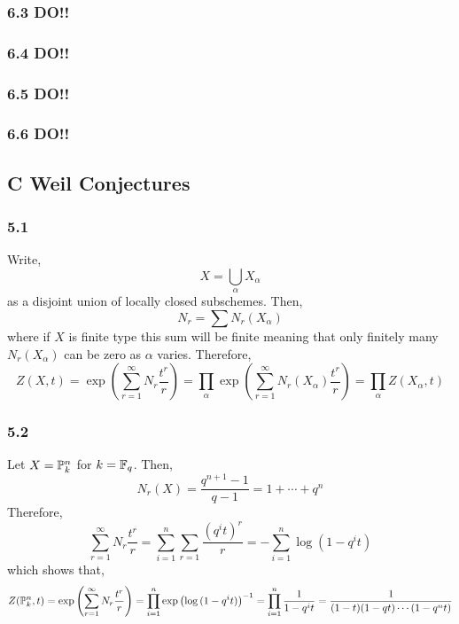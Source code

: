 \documentclass[12pt]{article}
\begin{document}
\subsubsection{6.3 DO!!}


\subsubsection{6.4 DO!!}

\subsubsection{6.5 DO!!}

\subsubsection{6.6 DO!!}


\subsection{C Weil Conjectures}

\subsubsection{5.1}

Write,
\[ X = \bigcup_{\alpha} X_\alpha \]
as a disjoint union of locally closed subschemes. Then,
\[ N_r = \sum N_r(X_\alpha) \]
where if $X$ is finite type this sum will be finite meaning that only finitely many $N_r(X_\alpha)$ can be zero as $\alpha$ varies. Therefore,
\[ Z(X, t) = \exp{ \left( \sum_{r = 1}^\infty N_r \frac{t^r}{r} \right)} = \prod_{\alpha} \exp{ \left( \sum_{r = 1}^\infty N_r(X_\alpha) \frac{t^r}{r} \right)} = \prod_{\alpha} Z(X_\alpha, t) \]

\subsubsection{5.2}

Let $X = \P^n_k$ for $k = \FF_q$. Then,
\[ N_r(X) = \frac{q^{n+1} - 1}{q - 1} = 1 + \cdots + q^{n} \]
Therefore,
\[ \sum_{r = 1}^\infty N_r \frac{t^r}{r} = \sum_{i = 1}^n \sum_{r = 1} \frac{(q^i t)^r}{r} = - \sum_{i = 1}^n \log{(1 - q^i t)} \]
which shows that,
\[ Z(\P^n_k, t) = \exp{ \left( \sum_{r = 1}^\infty N_r \frac{t^r}{r} \right) } = \prod_{i = 1}^n \exp{\left(\log{(1 - q^i t)}\right)}^{-1} = \prod_{i = 1}^n \frac{1}{1 - q^i t} = \frac{1}{(1 - t)(1 - q t) \cdots (1 - q^n t)} \] 
\end{document}
